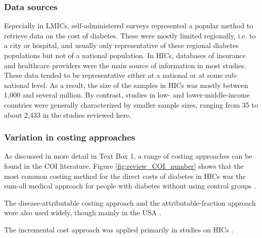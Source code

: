 \subsubsection{Data sources}
Especially in \acp{LMIC}, self-administered surveys represented a popular method to retrieve data on the cost of diabetes. These were mostly limited regionally, i.e. to a city or hospital, and usually only representative of these regional diabetes populations but not of a national population. In \acp{HIC}, databases of insurance and healthcare providers were the main source of information in most studies. These data tended to be representative either at a national or at some sub-national level. As a result, the size of the samples in \acp{HIC} was mostly between 1,000 and several million. By contrast, studies in low- and lower-middle-income countries were generally characterized by smaller sample sizes, ranging from 35 \parencite{Suleiman2006} to about 2,433 \parencite{Yang2012} in the studies reviewed here.

\subsubsection{Variation in costing approaches}
As discussed in more detail in Text Box 1, a range of costing approaches can be found in the \ac{COI} literature. Figure \ref{fig:review_COI_number} shows that the most common costing method for the direct costs of diabetes in \acp{HIC} was the sum-all medical approach for people with diabetes without using control groups \parencite{Kirigia2009,Boutayeb2014,Barcelo2003,Jonsson2002b,Ohinmaa2004,Lau2011a,Pohar2007,Gonzalez2009b,Horak2009,Martin2007b,Nolan2006c,Lucioni2003,Morsanutto2006b,Nakamura2008,Arredondo2004,Arredondo2007,Arredondo2005a,Arredondo2011b,Redekop2002b,Bjegovic2007b,Oliva2004a,Ringborg2008a,Chi2011a,Zhou2005a,Condliffe2014,Brandle2003d,Peele2002a,Lee2006,Maciejewski2004}. 

The disease-attributable costing approach \parencite{Suleiman2006,Abdulkadri2009b,Davis2006b,Simpson2003,RodriguezBolanos2010a,Solli2010a,Ballesta2006,Mata2002a,Lin2004,Dall2003a,Buescher2010,Tunceli2010c,Johnson2006d,Honkasalo2014,Bastida2002} and the attributable-fraction approach were also used widely, though mainly in the USA \parencite{AmericalDiabetesAssociation2008,Dawson2002b,Schmitt-Koopmann2004b,Dall2010,Bolin2009d,Honeycutt2009a,Lesniowska2014}. 

The incremental cost approach was applied primarily in studies on \acp{HIC} \parencite{Smith-Spangler2012,Yang2012,Tunceli2010c,Honeycutt2009a,Pohar2007a,Ricordeau2003,Koster2011c,Koster2006c,Koster2012,Esteghamati2009,Chodick2005a,Marchesini2011b,Bruno2012,Norlund2001a,Wirehn2008b,Birnbaum2003c,Durden2009b,Rodbard2010b,Oconnell2012,Trogdon2008a,Ramsey2002a,VanderLinden2009c}.  

